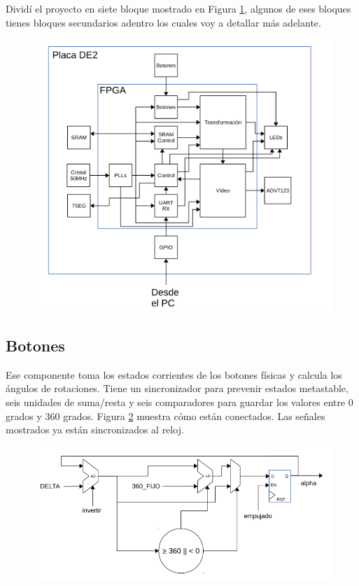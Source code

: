\documentclass[a4paper]{article}
\begin{document}
Dividí el proyecto en siete bloque mostrado en Figura \ref{fig:tp4_bloques}, algunos de eses bloques tienes bloques secundarios adentro los cuales voy a detallar más adelante.

\begin{figure}[!h]
\includegraphics[width=15cm]{img/TP4_diagrama_de_bloques.png}
\label{fig:tp4_bloques}
\end{figure}

\subsection{Botones}

Ese componente toma los estados corrientes de los botones físicas y calcula los ángulos de rotaciones. Tiene un sincronizador para prevenir estados metastable, seis unidades de suma/resta y seis comparadores para guardar los valores entre 0 grados y 360 grados. Figura \ref{fig:botones} muestra cómo están conectados. Las señales mostrados ya están sincronizados al reloj.

\begin{figure}[!h]
\includegraphics[width=15cm]{img/botones_bloques.png}
\label{fig:botones}
\end{figure}
\end{document}
